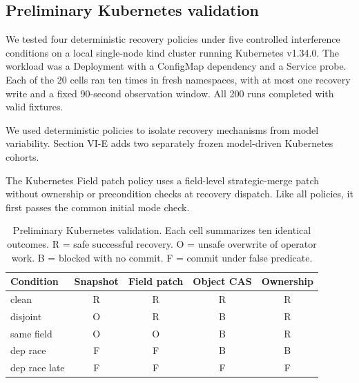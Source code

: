 \documentclass[conference,10pt]{IEEEtran}
\begin{document}
\subsection{Preliminary Kubernetes validation}

We tested four deterministic recovery policies under five controlled interference conditions on a local single\hyp{}node kind cluster running Kubernetes v1.34.0. The workload was a Deployment with a ConfigMap dependency and a Service probe. Each of the 20 cells ran ten times in fresh namespaces, with at most one recovery write and a fixed 90-second observation window. All 200 runs completed with valid fixtures.

We used deterministic policies to isolate recovery mechanisms from model variability. Section VI\hyp{}E adds two separately frozen model\hyp{}driven Kubernetes cohorts.

The Kubernetes Field patch policy uses a field\hyp{}level strategic\hyp{}merge patch without ownership or precondition checks at recovery dispatch. Like all policies, it first passes the common initial mode check.

\begin{table}[!t]

\caption{Preliminary Kubernetes validation. Each cell summarizes ten identical outcomes. R = safe successful recovery. O = unsafe overwrite of operator work. B = blocked with no commit. F = commit under false predicate.}

\label{tab:5}

\centering\footnotesize

\setlength{\tabcolsep}{3pt}

\renewcommand{\arraystretch}{1.12}

\begin{tabular}{@{}lcccc@{}}

\toprule

Condition & Snapshot & Field patch & Object CAS & Ownership \\

\midrule

clean & R & R & R & R \\

disjoint & O & R & B & R \\

same field & O & O & B & R \\

dep race & F & F & B & B \\

dep race late & F & F & F & F \\

\bottomrule

\end{tabular}

\end{table}
\end{document}
